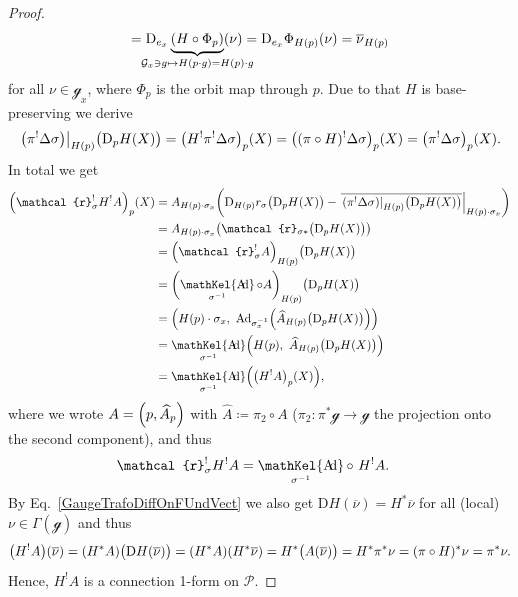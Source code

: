 \documentclass[reqno,a4paper,oneside]{amsart}
\theoremstyle{plain}
\theoremstyle{remark}
\theoremstyle{definition}
\DeclareMathOperator{\sAd}{\mathKel{A\mkern-5.5mu d}}
\begin{document}
\begin{proof}
\begin{equation}
=
\mathrm{D}_{e_x}\underbrace{\mleft(H \circ\Phi_p \mright)}_{\mathclap{ \mathcal{G}_x \ni g \mapsto H(p \cdot g) = H(p) \cdot g }} (\nu)
=
\mathrm{D}_{e_x} \Phi_{H(p)} (\nu)
=
\overline{\nu}_{H(p)}
\end{equation}
for all $\nu \in \mathcal{g}_x$, where $\Phi_p$ is the orbit map through $p$. Due to that $H$ is base-preserving we derive
\begin{equation*}
\mleft. \mleft( \pi^!\Delta\sigma \mright) \mright|_{H(p)}\bigl(\mathrm{D}_pH(X)\bigr)
=
\mleft( H^! \pi^! \Delta \sigma \mright)_p (X)
=
\mleft( (\pi \circ H)^! \Delta \sigma \mright)_p (X)
=
\mleft( \pi^! \Delta \sigma \mright)_p (X).
\end{equation*}
In total we get
\begin{align*}
\mleft(\mathcal{r}_\sigma^!H^!A\mright)_p(X)
&=
A_{H(p) \cdot \sigma_x}\mleft( 
	\mathrm{D}_{H(p)}r_\sigma \bigl(\mathrm{D}_pH( X )\bigr)
	- \mleft.{\overline{
		\mleft. \mleft( \pi^!\Delta\sigma \mright) \mright|_{H(p)}\bigl( \mathrm{D}_pH(X) \bigr)
	}}\mright|_{H(p) \cdot \sigma_{x}}
\mright)
\\
&=
A_{H(p) \cdot \sigma_x}\mleft(
	\mathcal{r}_{\sigma*}\bigl(\mathrm{D}_pH( X )\bigr)
\mright)
\\
&=
\mleft( \mathcal{r}_\sigma^!A \mright)_{H(p)}\bigl(\mathrm{D}_pH( X )\bigr)
\\
&=
\mleft( \sAd_{\sigma^{-1}} \circ A \mright)_{H(p)}\bigl(\mathrm{D}_pH( X )\bigr)
\\
&=
\mleft( H(p) \cdot \sigma_x, ~\mathrm{Ad}_{\sigma_x^{-1}}\mleft( \widehat{A}_{H(p)}\bigl(\mathrm{D}_pH( X )\bigr) \mright) \mright)
\\
&=
\sAd_{\sigma^{-1}}
\mleft( H(p), ~\widehat{A}_{H(p)}\bigl(\mathrm{D}_pH( X )\bigr) \mright)
\\
&=
\sAd_{\sigma^{-1}}
\mleft( \mleft(H^!A\mright)_p(X) \mright),
\end{align*}
where we wrote $A = \mleft( p, \widehat{A}_p \mright)$ with $\widehat{A} \coloneqq \pi_2 \circ A$ ($\pi_2: \pi^*\mathcal{g} \to \mathcal{g}$ the projection onto the second component), and thus
\begin{align*}
\mathcal{r}_\sigma^!H^!A
&=
\sAd_{\sigma^{-1}}\circ~ H^!A.
\end{align*}
By Eq.\ \eqref{GaugeTrafoDiffOnFUndVect} we also get $\mathrm{D}H(\overline{\nu}) = H^*\overline{\nu}$ for all (local) $\nu \in \Gamma(\mathcal{g})$ and thus
\begin{equation*}
\mleft(H^!A\mright)\mleft( \overline{\nu} \mright)
=
\mleft(H^*A\mright)\bigl( \mathrm{D}H\mleft( \overline{\nu} \mright) \bigr)
=
\mleft(H^*A\mright)\mleft( H^*\overline{\nu} \mright)
=
H^*\bigl( A\mleft( \overline{\nu}\mright) \bigr)
=
H^*\pi^*\nu
=
(\pi \circ H)^*\nu
=
\pi^*\nu.
\end{equation*}
Hence, $H^!A$ is a connection 1-form on $\mathcal{P}$.


\end{proof}
\end{document}
